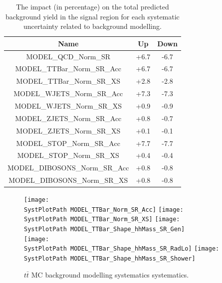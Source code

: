 \begin{table}[htbp!]
\begin{center}
\begin{tabular}{c|c|c}
Name                                &      Up  &     Down  \\
\hline
MODEL\_QCD\_Norm\_SR               &     +6.7 &     -6.7  \\
MODEL\_TTBar\_Norm\_SR\_Acc        &     +6.7 &     -6.7  \\
MODEL\_TTBar\_Norm\_SR\_XS         &     +2.8 &     -2.8  \\
MODEL\_WJETS\_Norm\_SR\_Acc        &     +7.3 &     -7.3  \\
MODEL\_WJETS\_Norm\_SR\_XS         &     +0.9 &     -0.9  \\
MODEL\_ZJETS\_Norm\_SR\_Acc        &     +0.8 &     -0.7  \\
MODEL\_ZJETS\_Norm\_SR\_XS         &     +0.1 &     -0.1  \\
MODEL\_STOP\_Norm\_SR\_Acc         &     +7.7 &     -7.7  \\
MODEL\_STOP\_Norm\_SR\_XS          &     +0.4 &     -0.4  \\
MODEL\_DIBOSONS\_Norm\_SR\_Acc     &     +0.8 &     -0.8  \\
MODEL\_DIBOSONS\_Norm\_SR\_XS      &     +0.8 &     -0.8  \\
\end{tabular}
\end{center}
\caption{The impact (in percentage) on the total predicted background yield in the 
signal region for each systematic uncertainty related to background modelling.} 
\label{tab:boosted_systematics_modelling_sr_background}
\end{table}

\begin{figure}[!h]
\begin{center}
\texttt{[image: \\SystPlotPath MODEL\_TTBar\_Norm\_SR\_Acc]}
\texttt{[image: \\SystPlotPath MODEL\_TTBar\_Norm\_SR\_XS]} 
\texttt{[image: \\SystPlotPath MODEL\_TTBar\_Shape\_hhMass\_SR\_Gen]} \\
\texttt{[image: \\SystPlotPath MODEL\_TTBar\_Shape\_hhMass\_SR\_RadLo]} 
\texttt{[image: \\SystPlotPath MODEL\_TTBar\_Shape\_hhMass\_SR\_Shower]} \\
\caption{$t\bar{t}$ MC background modelling systematics systematics.}
\label{fig:systplots_ttbar}
\end{center}
\end{figure}

